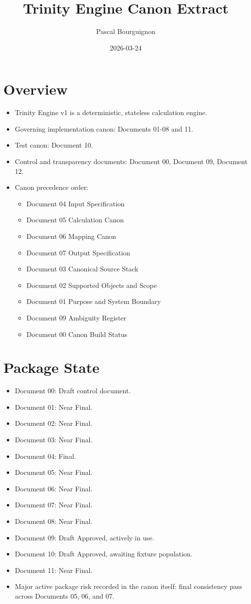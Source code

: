 \documentclass[11pt]{article}
\author{Pascal Bourguignon}
\date{2026-03-24}
\title{Trinity Engine Canon Extract}
\begin{document}
\maketitle
\tableofcontents

\section{Overview}
\label{sec:org42dc89e}
\begin{itemize}
\item Trinity Engine v1 is a deterministic, stateless calculation engine.
\item Governing implementation canon: Documents 01-08 and 11.
\item Test canon: Document 10.
\item Control and transparency documents: Document 00, Document 09, Document 12.
\item Canon precedence order:
\begin{itemize}
\item Document 04 Input Specification
\item Document 05 Calculation Canon
\item Document 06 Mapping Canon
\item Document 07 Output Specification
\item Document 03 Canonical Source Stack
\item Document 02 Supported Objects and Scope
\item Document 01 Purpose and System Boundary
\item Document 09 Ambiguity Register
\item Document 00 Canon Build Status
\end{itemize}
\end{itemize}
\section{Package State}
\label{sec:org10738c0}
\begin{itemize}
\item Document 00: Draft control document.
\item Document 01: Near Final.
\item Document 02: Near Final.
\item Document 03: Near Final.
\item Document 04: Final.
\item Document 05: Near Final.
\item Document 06: Near Final.
\item Document 07: Near Final.
\item Document 08: Near Final.
\item Document 09: Draft Approved, actively in use.
\item Document 10: Draft Approved, awaiting fixture population.
\item Document 11: Near Final.
\item Major active package risk recorded in the canon itself: final consistency pass across Documents 05, 06, and 07.
\end{itemize}
\end{document}
